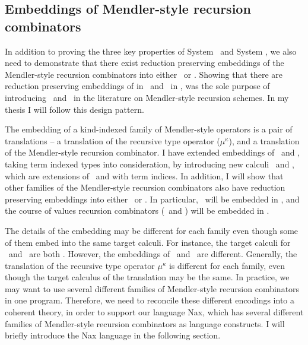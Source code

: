 \subsection{Embeddings of Mendler-style recursion combinators} In
addition to proving the three key properties of System \Fi\ and System
\Fixi, we also need to demonstrate that there exist reduction preserving
embeddings of the Mendler-style recursion combinators into either \Fi\ or
\Fixi. Showing that there are reduction preserving embeddings of \MIt in
\Fw\ and \MPr\ in \Fixw, was the sole purpose of introducing \Fw\ and \Fixw\ in
the literature on Mendler-style recursion schemes. In my thesis
I will follow this design pattern.

The embedding of a kind-indexed family of Mendler-style operators is
a pair of translations -- a translation of the recursive type operator
($\mu^\kappa$), and a translation of the Mendler-style recursion combinator. 
I have extended embeddings of \MIt\ and \MPr, taking term indexed
types into consideration, by introducing new calculi \Fi\ and \Fixw,
which are extensions of \Fw\ and \Fixi with term indices. In addition,
I will show that other families of the Mendler-style recursion combinators
also have reduction preserving embeddings into either \Fi\ or \Fixi.
In particular, \MsfIt\ will be embedded in \Fi, and the course of values
recursion combinators (\McvIt\ and \McvPr) will be embedded in \Fixi.

The details of the embedding may be different for each family even though
some of them embed into the same target calculi. For instance, the target
calculi for \MIt\ and \MsfIt\ are both \Fi. However, the embeddings
of \MIt\ and \MsfIt\ are different. Generally, the translation of
the recursive type operator $\mu^\kappa$ is different for each family,
even though the target calculus of the translation may be the same.
In practice, we may want to use several different families of Mendler-style
recursion combinators in one program. Therefore, we need to reconcile
these different encodings into a coherent theory, in order to support
our language Nax, which has several different families of Mendler-style
recursion combinators as language constructs. I will briefly introduce
the Nax language in the following section.

